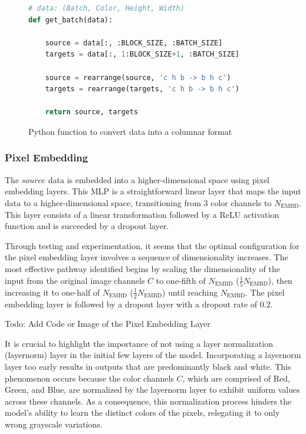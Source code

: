\begin{figure}[H]
\centering
\begin{lstlisting}[language=Python]
# data: (Batch, Color, Height, Width)
def get_batch(data):

    source = data[:, :BLOCK_SIZE, :BATCH_SIZE]
    targets = data[:, 1:BLOCK_SIZE+1, :BATCH_SIZE]

    source = rearrange(source, 'c h b -> b h c')
    targets = rearrange(targets, 'c h b -> b h c')

    return source, targets
\end{lstlisting}
\caption{Python function to convert data into a columnar format}
\label{fig:get_batch_CIT}
\end{figure}

    \subsubsection{Pixel Embedding}

    The \(source\) data is embedded into a higher-dimensional space using pixel embedding layers. This MLP is a straightforward linear layer that maps the input data to a higher-dimensional space, transitioning from \(3\) color channels to \(N_{\text{EMBD}}\). This layer consists of a linear transformation followed by a ReLU activation function and is succeeded by a dropout layer.

    Through testing and experimentation, it seems that the optimal configuration for the pixel embedding layer involves a sequence of dimensionality increases. The most effective pathway identified begins by scaling the dimensionality of the input from the original image channels \(C\) to one-fifth of \(N_{\text{EMBD}}\) (\(\frac{1}{5}N_{\text{EMBD}}\)), then increasing it to one-half of \(N_{\text{EMBD}}\) (\(\frac{1}{2}N_{\text{EMBD}}\)) until reaching \(N_{\text{EMBD}}\). The pixel embedding layer is followed by a dropout layer with a dropout rate of 0.2.

    Todo: Add Code or Image of the Pixel Embedding Layer

    It is crucial to highlight the importance of not using a layer normalization (layernorm) layer in the initial few layers of the model. Incorporating a layernorm layer too early results in outputs that are predominantly black and white. This phenomenon occurs because the color channels \(C\), which are comprised of Red, Green, and Blue, are normalized by the layernorm layer to exhibit uniform values across these channels. As a consequence, this normalization process hinders the model's ability to learn the distinct colors of the pixels, relegating it to only wrong grayscale variations.

